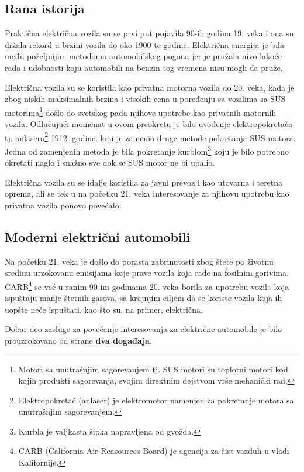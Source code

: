 \documentclass[a4paper]{article}
\begin{document}
\subsection{Rana istorija}
\label{subsec:podnaslov1}

Praktična električna vozila su se prvi put pojavila 90-ih godina 19. veka i ona su držala rekord u brzini vozila do oko 1900-te godine. Električna energija je bila među poželjnijim metodoma automobilskog pogona jer je pružala nivo lakoće rada i udobnosti koju automobili na benzin tog vremena nisu mogli da pruže.

Električna vozila su se koristila kao privatna motorna vozila do 20. veka, kada je zbog niskih maksimalnih brzina i visokih cena u poređenju sa vozilima sa SUS motorima\footnote{Motori sa unutrašnjim sagorevanjem tj. SUS motori su toplotni motori kod kojih produkti sagorevanja, svojim direktnim dejstvom vrše mehanički rad.} došlo do svetskog pada njihove upotrebe kao privatnih motornih vozila. Odlučujući momenat u ovom preokretu je bilo uvođenje elektropokretača tj. anlasera\footnote{Elektropokretač (anlaser) je elektromotor namenjen za pokretanje motora sa unutrašnjim sagorevanjem.} 1912. godine. koji je zamenio druge metode pokretanja SUS motora. Jedna od zamenjenih metoda je bila pokretanje kurblom\footnote{Kurbla je valjkasta šipka napravljena od gvožđa.} koju je bilo potrebno okretati naglo i snažno sve dok se SUS motor ne bi upalio.

Električna vozila su se idalje koristila za javni prevoz i kao utovarna i teretna oprema, ali se tek u na početku 21. veka interesovanje za njihovu upotrebu kao privatna vozila ponovo povećalo.
\cite{ranaistorija}


\subsection{Moderni električni automobili}
\label{subsec:podnaslov2}


Na početku 21. veka je došlo do porasta zabrinutosti zbog štete po životnu sredinu urzokovanu emisijama koje prave vozila koja rade na fosilnim gorivima. CARB\footnote{CARB (California Air Reasources Board) je agencija za čist vazduh u vladi Kalifornije.} se već u ranim 90-im godinama 20. veka borila za upotrebu vozila koja ispuštaju manje štetnih gasova, sa krajnjim ciljem da se koriste vozila koja ih uopšte neće ispuštati, kao što su, na primer, električna.

Dobar deo zasluge za povećanje interesovanja za električne automobile je bilo prouzrokovano od strane \textbf{dva događaja}.
\end{document}
